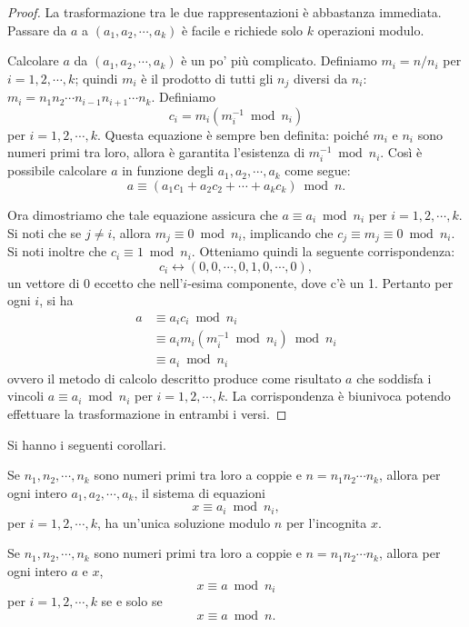 \begin{proof}
La trasformazione tra le due rappresentazioni è abbastanza immediata. Passare da $a$ a $(a_1, a_2, \cdots , a_k)$ è facile e richiede solo $k$ operazioni modulo.

Calcolare $a$ da $(a_1, a_2, \cdots , a_k)$ è un po' più complicato. Definiamo $m_i=n/n_i$ per $i=1,2,\cdots,k$; quindi $m_i$ è il prodotto di tutti gli $n_j$ diversi da $n_i$: $m_i=n_1n_2\cdots n_{i-1}n_{i+1}\cdots n_k$. Definiamo
\[
c_i = m_i(m_i^{-1}\bmod n_i)
\]
per $i=1,2,\cdots,k$. Questa equazione è sempre ben definita: poiché $m_i$ e $n_i$ sono numeri primi tra loro, allora è garantita l'esistenza di $m_i^{-1}\bmod n_i$. Così è possibile calcolare $a$ in funzione degli $a_1,a_2,\cdots,a_k$ come segue:
\[
a \equiv (a_1c_1+a_2c_2+\cdots+a_kc_k)\bmod n.
\]

Ora dimostriamo che tale equazione assicura che $a\equiv a_i \bmod n_i$ per $i=1,2,\cdots,k$. Si noti che se $j\neq i$, allora $m_j \equiv 0 \bmod n_i$, implicando che $c_j \equiv m_j \equiv 0 \bmod n_i$. Si noti inoltre che $c_i \equiv 1\bmod n_i$. Otteniamo quindi la seguente corrispondenza:
\[
c_i \leftrightarrow (0,0,\cdots,0,1,0,\cdots,0),
\]
un vettore di 0 eccetto che nell'$i$-esima componente, dove c'è un 1. Pertanto per ogni $i$, si ha
\begin{align*}
a &\equiv a_ic_i \bmod n_i \\
&\equiv a_im_i(m_i^{-1} \bmod n_i) \bmod n_i \\
&\equiv a_i \bmod n_i
\end{align*}
ovvero il metodo di calcolo descritto produce come risultato $a$ che soddisfa i vincoli $a\equiv a_i \bmod n_i$ per $i=1,2,\cdots,k$.
La corrispondenza è biunivoca potendo effettuare la trasformazione in entrambi i versi.
\end{proof}

Si hanno i seguenti corollari.

\begin{corollario}
Se $n_1,n_2,\cdots,n_k$ sono numeri primi tra loro a coppie e $n=n_1n_2\cdots n_k$, allora per ogni intero $a_1, a_2, \cdots, a_k$, il sistema di equazioni
\[
x \equiv a_i \bmod n_i,
\]
per $i=1,2,\cdots,k$, ha un'unica soluzione modulo $n$ per l'incognita $x$.
\end{corollario}

\begin{corollario}
Se $n_1,n_2,\cdots,n_k$ sono numeri primi tra loro a coppie e $n=n_1n_2\cdots n_k$, allora per ogni intero $a$ e $x$,
\[
x \equiv a\bmod n_i
\]
per $i=1,2,\cdots,k$ se e solo se
\[
x \equiv a\bmod n.
\]
\end{corollario}


